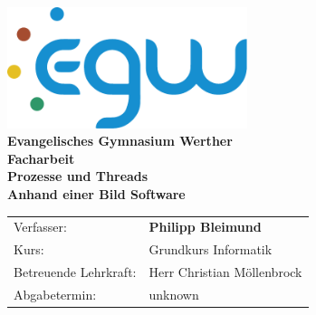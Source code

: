 \author{Philipp Bleimund}

\begin{titlepage}
    \begin{center}
        \includegraphics[width=7cm]{images/logo.pdf}\\
        \textbf{Evangelisches Gymnasium Werther}\\[8ex]
        \LARGE{\textbf{Facharbeit}}\\[3ex]
        \huge{\textbf{Prozesse und Threads}}\\[2ex]
        \large{\textbf{Anhand einer Bild Software}}\\ [50ex]
        \normalsize{}
        \begin{tabular}{ll}
            Verfasser:            & \quad \textbf{Philipp Bleimund}     \\[3ex]
            Kurs:                 & \quad Grundkurs Informatik          \\ [1ex]
            Betreuende Lehrkraft: & \quad Herr Christian Möllenbrock    \\[1ex]
            Abgabetermin:         & \quad unknown                       \\[1ex]
        \end{tabular}
    \end{center}
\end{titlepage}